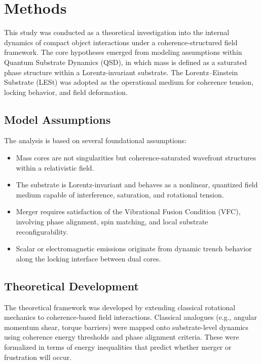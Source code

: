 \documentclass[sn-mathphys]{sn-jnl}
\theoremstyle{thmstyleone}%
\theoremstyle{thmstyletwo}%
\theoremstyle{thmstylethree}%
\begin{document}
\section*{Methods}

This study was conducted as a theoretical investigation into the internal dynamics of compact object interactions under a coherence-structured field framework. The core hypotheses emerged from modeling assumptions within Quantum Substrate Dynamics (QSD), in which mass is defined as a saturated phase structure within a Lorentz-invariant substrate. The Lorentz--Einstein Substrate (LESt) was adopted as the operational medium for coherence tension, locking behavior, and field deformation.

\subsection*{Model Assumptions}

The analysis is based on several foundational assumptions:
\begin{itemize}
    \item Mass cores are not singularities but coherence-saturated wavefront structures within a relativistic field.
    \item The substrate is Lorentz-invariant and behaves as a nonlinear, quantized field medium capable of interference, saturation, and rotational tension.
    \item Merger requires satisfaction of the Vibrational Fusion Condition (VFC), involving phase alignment, spin matching, and local substrate reconfigurability.
    \item Scalar or electromagnetic emissions originate from dynamic trench behavior along the locking interface between dual cores.
\end{itemize}

\subsection*{Theoretical Development}

The theoretical framework was developed by extending classical rotational mechanics to coherence-based field interactions. Classical analogues (e.g., angular momentum shear, torque barriers) were mapped onto substrate-level dynamics using coherence energy thresholds and phase alignment criteria. These were formalized in terms of energy inequalities that predict whether merger or frustration will occur.
\end{document}
